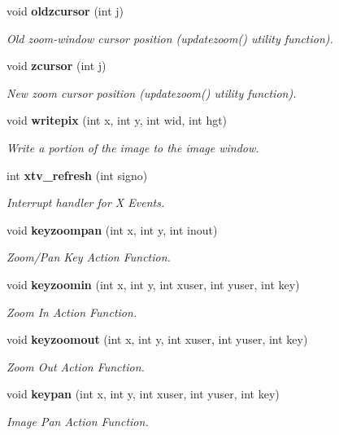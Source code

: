 \begin{CompactItemize}
\item 
void {\bf oldzcursor} (int j)
\begin{CompactList}\small\item\em Old zoom-window cursor position (updatezoom() utility function). \item\end{CompactList}\item 
void {\bf zcursor} (int j)
\begin{CompactList}\small\item\em New zoom cursor position (updatezoom() utility function). \item\end{CompactList}\item 
void {\bf writepix} (int x, int y, int wid, int hgt)
\begin{CompactList}\small\item\em Write a portion of the image to the image window. \item\end{CompactList}\item 
int {\bf xtv\_\-refresh} (int signo)
\begin{CompactList}\small\item\em Interrupt handler for X Events. \item\end{CompactList}\item 
void {\bf keyzoompan} (int x, int y, int inout)
\begin{CompactList}\small\item\em Zoom/Pan Key Action Function. \item\end{CompactList}\item 
void {\bf keyzoomin} (int x, int y, int xuser, int yuser, int key)
\begin{CompactList}\small\item\em Zoom In Action Function. \item\end{CompactList}\item 
void {\bf keyzoomout} (int x, int y, int xuser, int yuser, int key)
\begin{CompactList}\small\item\em Zoom Out Action Function. \item\end{CompactList}\item 
void {\bf keypan} (int x, int y, int xuser, int yuser, int key)
\begin{CompactList}\small\item\em Image Pan Action Function. \item\end{CompactList}\item 

\end{CompactItemize}
